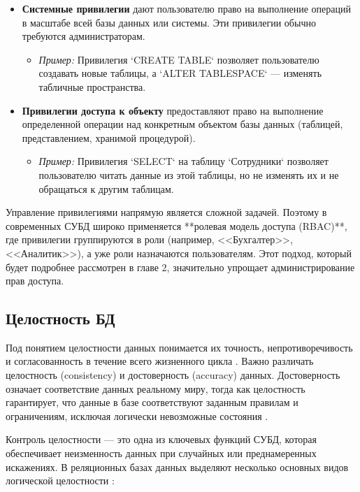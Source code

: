 \begin{itemize}
    \item \textbf{Системные привилегии} дают пользователю право на выполнение операций в масштабе всей базы данных или системы. Эти привилегии обычно требуются администраторам.
    \begin{itemize}
        \item \textit{Пример:} Привилегия `CREATE TABLE` позволяет пользователю создавать новые таблицы, а `ALTER TABLESPACE` — изменять табличные пространства.
    \end{itemize}

    \item \textbf{Привилегии доступа к объекту} предоставляют право на выполнение определенной операции над конкретным объектом базы данных (таблицей, представлением, хранимой процедурой).
    \begin{itemize}
        \item \textit{Пример:} Привилегия `SELECT` на таблицу `Сотрудники` позволяет пользователю читать данные из этой таблицы, но не изменять их и не обращаться к другим таблицам.
    \end{itemize}
\end{itemize}

Управление привилегиями напрямую является сложной задачей. Поэтому в современных СУБД широко применяется **ролевая модель доступа (RBAC)**, где привилегии группируются в роли (например, <<Бухгалтер>>, <<Аналитик>>), а уже роли назначаются пользователям. Этот подход, который будет подробнее рассмотрен в главе 2, значительно упрощает администрирование прав доступа.

\subsection{Целостность БД}
Под понятием целостности данных понимается их точность, непротиворечивость и согласованность в течение всего жизненного цикла \autocite[с. 18]{Skakun}. Важно различать целостность (consistency) и достоверность (accuracy) данных. Достоверность означает соответствие данных реальному миру, тогда как целостность гарантирует, что данные в базе соответствуют заданным правилам и ограничениям, исключая логически невозможные состояния \autocite{ElmasriNavathe}.

Контроль целостности — это одна из ключевых функций СУБД, которая обеспечивает неизменность данных при случайных или преднамеренных искажениях. В реляционных базах данных выделяют несколько основных видов логической целостности \autocite{Silberschatz}:


